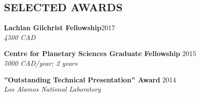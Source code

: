 \documentclass[10pt]{res} %
\begin{document}
\begin{resume}
% 
 


\section{SELECTED AWARDS}

\textbf{Lachlan Gilchrist Fellowship}\hfill 2017\\
{\sl 4500 CAD}

\textbf{Centre for Planetary Sciences Graduate Fellowship} \hfill 2015\\
{\sl 5000 CAD/year; 2 years}

\textbf{”Outstanding Technical Presentation” Award} \hfill 2014\\
{\sl Los Alamos National Laboratory}


\end{resume}
\end{document}
